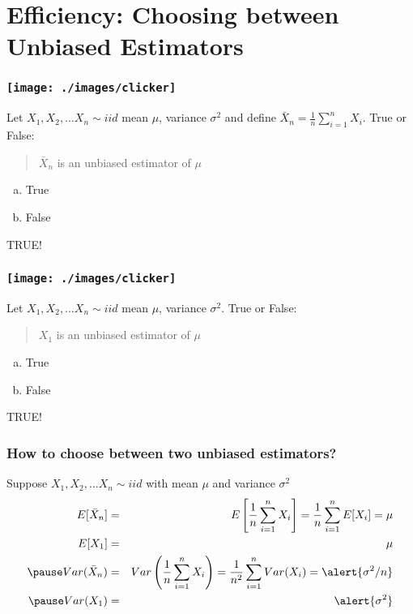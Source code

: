 \section{Efficiency: Choosing between Unbiased Estimators}
\begin{frame}
\frametitle{\texttt{[image: ./images/clicker]}}
Let $X_1, X_2, \hdots X_n \sim iid$ mean $\mu$, variance $\sigma^2$ and define $\bar{X}_n = \frac{1}{n}\sum_{i=1}^n X_i$. True or False:

\vspace{1em}
\begin{quotation}
$\bar{X}_n$ is an unbiased estimator of $\mu$
\end{quotation}

\begin{enumerate}[(a)]
\item True
\item False
\end{enumerate}
\pause

\alert{TRUE!}

\end{frame}

\begin{frame}
\frametitle{\texttt{[image: ./images/clicker]}}
Let $X_1, X_2, \hdots X_n \sim iid$ mean $\mu$, variance $\sigma^2$. True or False:

\vspace{1em}
\begin{quotation}
$X_1$ is an unbiased estimator of $\mu$
\end{quotation}

\begin{enumerate}[(a)]
\item True
\item False
\end{enumerate}

\pause \alert{TRUE!}
\end{frame}
\begin{frame}
\frametitle{How to choose between two unbiased estimators?}

Suppose $X_1, X_2, \hdots X_n \sim iid$ with mean $\mu$ and variance $\sigma^2$
\begin{eqnarray*}
E[\bar{X}_n] &=& E\left[\frac{1}{n}\sum_{i=1}^n X_i\right] = \frac{1}{n}\sum_{i=1}^n E[X_i] = \mu\\
E[X_1] &=& \mu\\
\pause
Var(\bar{X}_n) &=& Var\left(\frac{1}{n}\sum_{i=1}^n X_i\right) = \frac{1}{n^2} \sum_{i=1}^n Var(X_i) = \alert{\sigma^2/n}\\
\pause
Var(X_1) &=& \alert{\sigma^2}
\end{eqnarray*}
\end{frame}

